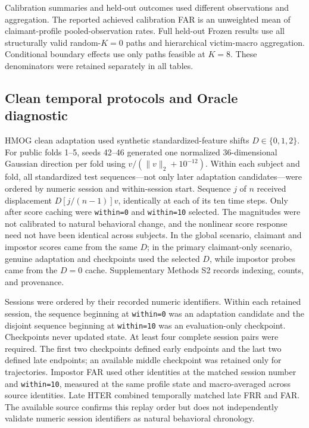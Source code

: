 \documentclass[technologies,article,submit,moreauthors]{Definitions/mdpi}
\begin{document}
Calibration summaries and held-out outcomes used different observations and aggregation. The reported achieved calibration FAR is an unweighted mean of claimant-profile pooled-observation rates. Full held-out Frozen results use all structurally valid random-\(K=0\) paths and hierarchical victim-macro aggregation. Conditional boundary effects use only paths feasible at \(K=8\). These denominators were retained separately in all tables.

\subsection{Clean temporal protocols and Oracle diagnostic}\label{sec:clean-temporal-protocols-and-oracle-diagnostic}

HMOG clean adaptation used synthetic standardized-feature shifts \(D\in\{0,1,2\}\). For public folds 1--5, seeds 42--46 generated one normalized 36-dimensional Gaussian direction per fold using \(v/(\lVert v\rVert_2+10^{-12})\). Within each subject and fold, all standardized test sequences---not only later adaptation candidates---were ordered by numeric session and within-session start. Sequence \(j\) of \(n\) received displacement \(D[j/(n-1)]v\), identically at each of its ten time steps. Only after score caching were \texttt{within=0} and \texttt{within=10} selected. The magnitudes were not calibrated to natural behavioral change, and the nonlinear score response need not have been identical across subjects. In the global scenario, claimant and impostor scores came from the same \(D\); in the primary claimant-only scenario, genuine adaptation and checkpoints used the selected \(D\), while impostor probes came from the \(D=0\) cache. Supplementary Methods S2 records indexing, counts, and provenance.

Sessions were ordered by their recorded numeric identifiers. Within each retained session, the sequence beginning at \texttt{within=0} was an adaptation candidate and the disjoint sequence beginning at \texttt{within=10} was an evaluation-only checkpoint. Checkpoints never updated state. At least four complete session pairs were required. The first two checkpoints defined early endpoints and the last two defined late endpoints; an available middle checkpoint was retained only for trajectories. Impostor FAR used other identities at the matched session number and \texttt{within=10}, measured at the same profile state and macro-averaged across source identities. Late HTER combined temporally matched late FRR and FAR. The available source confirms this replay order but does not independently validate numeric session identifiers as natural behavioral chronology.
\end{document}
